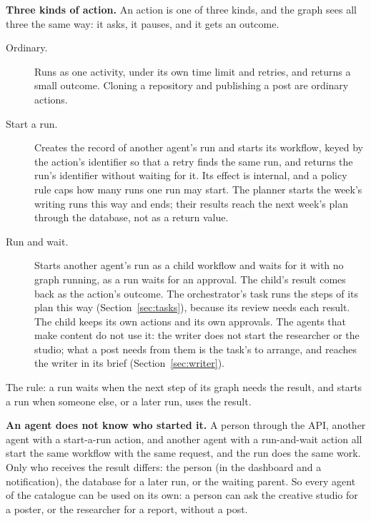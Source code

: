 \documentclass[11pt,a4paper]{article}
\begin{document}
\textbf{Three kinds of action.} An action is one of three kinds, and the graph sees all three the same way: it asks, it pauses, and it gets an outcome.
\begin{description}
  \item[Ordinary.] Runs as one activity, under its own time limit and retries, and returns a small outcome. Cloning a repository and publishing a post are ordinary actions.
  \item[Start a run.] Creates the record of another agent's run and starts its workflow, keyed by the action's identifier so that a retry finds the same run, and returns the run's identifier without waiting for it. Its effect is internal, and a policy rule caps how many runs one run may start. The planner starts the week's writing runs this way and ends; their results reach the next week's plan through the database, not as a return value.
  \item[Run and wait.] Starts another agent's run as a child workflow and waits for it with no graph running, as a run waits for an approval. The child's result comes back as the action's outcome. The orchestrator's task runs the steps of its plan this way (Section~\ref{sec:tasks}), because its review needs each result. The child keeps its own actions and its own approvals. The agents that make content do not use it: the writer does not start the researcher or the studio; what a post needs from them is the task's to arrange, and reaches the writer in its brief (Section~\ref{sec:writer}).
\end{description}
The rule: a run waits when the next step of its graph needs the result, and starts a run when someone else, or a later run, uses the result.

\textbf{An agent does not know who started it.} A person through the API, another agent with a start-a-run action, and another agent with a run-and-wait action all start the same workflow with the same request, and the run does the same work. Only who receives the result differs: the person (in the dashboard and a notification), the database for a later run, or the waiting parent. So every agent of the catalogue can be used on its own: a person can ask the creative studio for a poster, or the researcher for a report, without a post.
\end{document}
